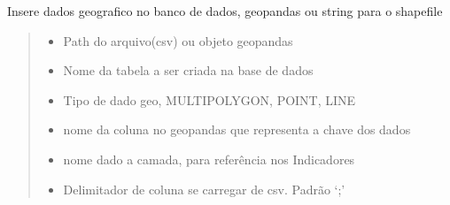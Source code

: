 \documentclass[letterpaper,10pt,brazil]{sphinxmanual}
\begin{document}
\begin{fulllineitems}
\begin{fulllineitems}
\label{\detokenize{api_gen/apiModulo.api_insercao:apiModulo.api_insercao.ApiIns.inserirCamada}}
\pysigstartsignatures
{}
\pysigstopsignatures
\sphinxAtStartPar
Insere dados geografico no banco de dados, geopandas ou string para o shapefile
\begin{quote}\begin{description}
\begin{itemize}
\item {} 
\sphinxAtStartPar
{} \textendash{} Path do arquivo(csv) ou objeto geopandas

\item {} 
\sphinxAtStartPar
{} \textendash{} Nome da tabela a ser criada na base de dados

\item {} 
\sphinxAtStartPar
{} \textendash{} Tipo de dado geo, MULTIPOLYGON, POINT, LINE

\item {} 
\sphinxAtStartPar
{} \textendash{} nome da coluna no geopandas que representa a chave dos dados

\item {} 
\sphinxAtStartPar
{} \textendash{} nome dado a camada, para referência nos Indicadores

\item {} 
\sphinxAtStartPar
{} \textendash{} Delimitador de coluna se carregar de csv. Padrão ‘;’

\end{itemize}

\end{description}\end{quote}

\end{fulllineitems}


\end{fulllineitems}
\end{document}
